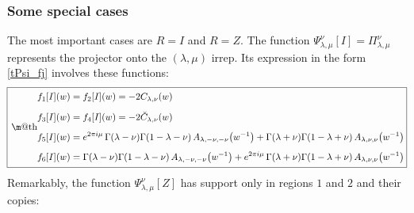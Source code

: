 \documentclass[11pt]{article}
\makeatletter
\newcommand*{\wideboxed}[1]{\setlength{\fboxsep}{1ex}%
  \fbox{\m@th$\displaystyle#1$}}
\newcommand{\bA}{\breve{A}}
\newcommand{\bC}{\breve{C}}
\makeatother
\begin{document}
\subsubsection{Some special cases}

The most important cases are $R=I$ and $R=Z$. The function $\Psi^{\nu}_{\lambda,\mu}[I]=\Pi^{\nu}_{\lambda,\mu}$ represents the projector onto the $(\lambda,\mu)$ irrep. Its expression in the form \eqref{tPsi_fj} involves these functions:
\begin{equation}
\!\wideboxed{
\begin{aligned}
f_{1}[I](w)&=f_{2}[I](w)=-2C_{\lambda,\nu}(w)
\\[5pt]
f_{3}[I](w)&=f_{4}[I](w)=-2\bC_{\lambda,\nu}(w)
\\[5pt]
f_{5}[I](w)&= e^{2\pi i\mu}\,
\Gamma(\lambda-\nu)\Gamma(1-\lambda-\nu)\,
A_{\lambda,-\nu,-\nu}\bigl(w^{-1}\bigr)
+\Gamma(\lambda+\nu)\Gamma(1-\lambda+\nu)\,
A_{\lambda,\nu,\nu}\bigl(w^{-1}\bigr)
\\[5pt]
f_{6}[I](w)&=\Gamma(\lambda-\nu)\Gamma(1-\lambda-\nu)\,
A_{\lambda,-\nu,-\nu}\big(w^{-1}\big)
+e^{2\pi i\mu}\,\Gamma(\lambda+\nu)\Gamma(1-\lambda+\nu)\,
A_{\lambda,\nu,\nu}\big(w^{-1}\big)
\end{aligned}\!
}\!
\end{equation}
Remarkably, the function $\Psi^{\nu}_{\lambda,\mu}[Z]$ has support only in regions $1$ and $2$ and their copies:
\end{document}
